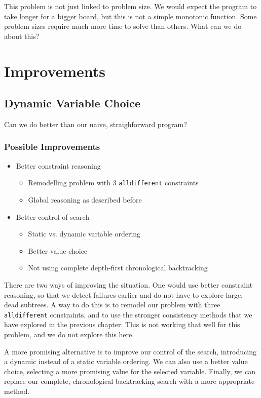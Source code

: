 This problem is not just linked to problem size. We would expect the program to take longer for a bigger board, but this is not a simple monotonic function. Some problem sizes require much more time to solve than others. What can we do about this?

\clearpage
\section{Improvements}
\subsection{Dynamic Variable Choice}

Can we do better than our naive, straighforward program?

\begin{frame}
\frametitle{Possible Improvements}
\begin{itemize}
\item Better constraint reasoning
\begin{itemize}
\item Remodelling problem with 3 \texttt{alldifferent} constraints
\item Global reasoning as described before
\end{itemize}
\item Better control of search
\begin{itemize}
\item Static vs. dynamic variable ordering
\item Better value choice
\item Not using complete depth-first chronological backtracking
\end{itemize}
\end{itemize}
\end{frame}

There are two ways of improving the situation. One would use better constraint reasoning, so that we detect failures earlier and do not have to explore large, dead subtrees. A way to do this is to remodel our problem with three \texttt{alldifferent} constraints, and to use the stronger consistency methods that we have explored in the previous chapter. This is not working that well for this problem, and we do not explore this here.

A more promising alternative is to improve our control of the search, introducing a dynamic instead of a static variable ordering. We can also use a better value choice, selecting a more promising value for the selected variable. Finally, we can replace our complete, chronological backtracking search with a more appropriate method.

